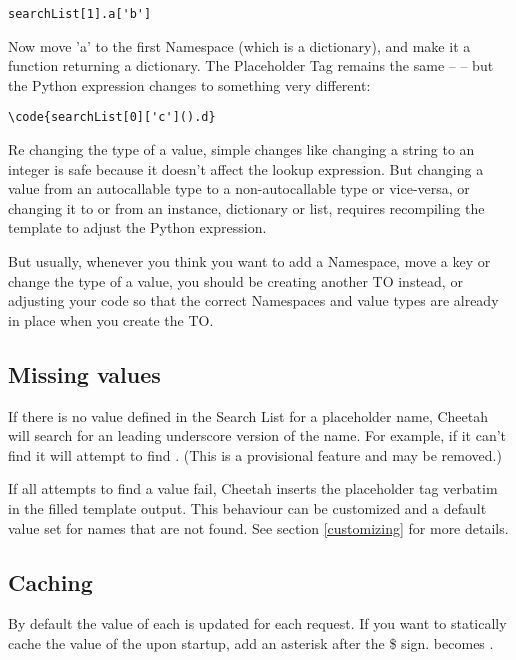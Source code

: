 \begin{verbatim}
searchList[1].a['b']
\end{verbatim}

Now move 'a' to the first Namespace (which is a dictionary), and make it a 
function returning a dictionary.  The Placeholder Tag remains the same --
 -- but the Python expression changes to something very different:

\begin{verbatim}
\code{searchList[0]['c']().d}
\end{verbatim}

Re changing the type of a value, simple changes like changing a string to an
integer is safe because it doesn't affect the lookup expression.  But 
changing a value from an autocallable type to a non-autocallable type or 
vice-versa, or changing it to or from an instance, dictionary or list, requires
recompiling the template to adjust the Python expression.

But usually, whenever you think you want to add a Namespace, move a key or
change the type of a value, you should be creating another TO instead, or
adjusting your code so that the correct Namespaces and value types are already
in place when you create the TO.


\subsection{Missing values}

If there is no value defined in the Search List for a placeholder name,
Cheetah will search for an leading underscore version of the name.  For
example, if it can't find  it will attempt to find
.  (This is a provisional feature and may be removed.)

If all attempts to find a value fail, Cheetah inserts the placeholder tag
verbatim in the filled template output.  This behaviour can be customized and a
default value set for names that are not found.  See section
\ref{customizing} for more details.


\subsection{Caching}

By default the value of each  is updated for each request.
If you want to statically cache the value of the  upon
startup, add an asterisk after the \$ sign.   becomes .

